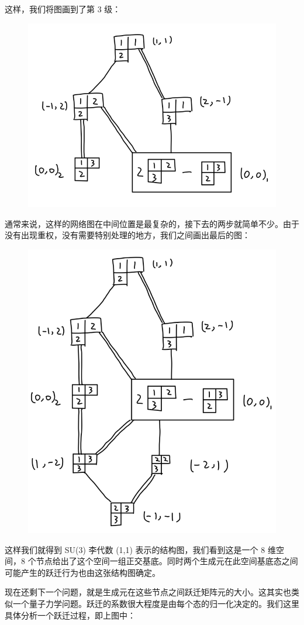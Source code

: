 \documentclass[UTF8]{ctexart}
\begin{document}
\noindent 这样，我们将图画到了第 3 级：

\begin{figure}[H]
\begin{centering}
\includegraphics[width=0.5\linewidth]{include/T2}
\par\end{centering}
\end{figure}

\noindent 通常来说，这样的网络图在中间位置是最复杂的，接下去的两步就简单不少。由于没有出现重权，没有需要特别处理的地方，我们之间画出最后的图：

\begin{figure}[H]
\begin{centering}
\includegraphics[width=0.5\linewidth]{include/T3}
\par\end{centering}
\end{figure}

\noindent 这样我们就得到 SU(3) 李代数 (1,1) 表示的结构图，我们看到这是一个 8 维空间，8 个节点给出了这个空间一组正交基底。同时两个生成元在此空间基底态之间可能产生的跃迁行为也由这张结构图确定。

现在还剩下一个问题，就是生成元在这些节点之间跃迁矩阵元的大小。这其实也类似一个量子力学问题。跃迁的系数很大程度是由每个态的归一化决定的。我们这里具体分析一个跃迁过程，即上图中：
\end{document}
